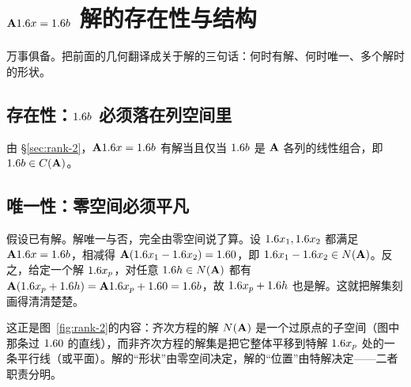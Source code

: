 \section{$\mathbf{A}1.6 x=1.6 b$ 解的存在性与结构}
\label{sec:rank-6}

万事俱备。把前面的几何翻译成关于解的三句话：何时有解、何时唯一、多个解时的形状。

\subsection*{存在性：$1.6 b$ 必须落在列空间里}

由 \S\ref{sec:rank-2}，$\mathbf{A}1.6 x=1.6 b$ 有解当且仅当 $1.6 b$ 是 $\mathbf{A}$ 各列的线性组合，即 $1.6 b\in C(\mathbf{A})$。


\subsection*{唯一性：零空间必须平凡}

假设已有解。解唯一与否，完全由零空间说了算。设 $1.6 x_1,1.6 x_2$ 都满足 $\mathbf{A}1.6 x=1.6 b$，相减得 $\mathbf{A}(1.6 x_1-1.6 x_2)=1.6 0$，即 $1.6 x_1-1.6 x_2\in N(\mathbf{A})$。反之，给定一个解 $1.6 x_p$，对任意 $1.6 h\in N(\mathbf{A})$ 都有 $\mathbf{A}(1.6 x_p+1.6 h)=\mathbf{A}1.6 x_p+1.6 0=1.6 b$，故 $1.6 x_p+1.6 h$ 也是解。这就把解集刻画得清清楚楚。


这正是图~\ref{fig:rank-2}的内容：齐次方程的解 $N(\mathbf{A})$ 是一个过原点的子空间（图中那条过 $1.6 0$ 的直线），而非齐次方程的解集是把它整体平移到特解 $1.6 x_p$ 处的一条平行线（或平面）。解的``形状''由零空间决定，解的``位置''由特解决定——二者职责分明。

